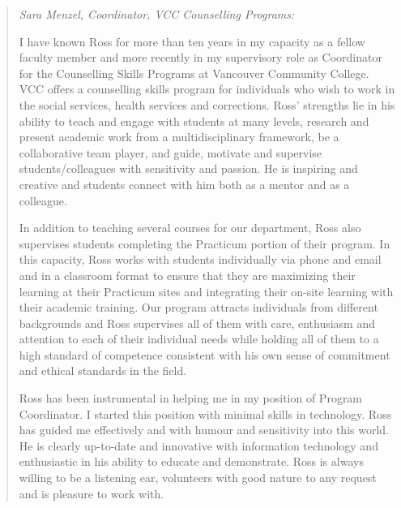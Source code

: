 \documentclass[10pt,DIV09,letterpaper,oneside,headsepline]{scrreprt}
\begin{document}
\begin{quotation}

\textit{Sara Menzel, Coordinator, VCC Counselling Programs:\\}

I have known Ross for more than ten years in my capacity as a fellow faculty member and more recently in my supervisory role as Coordinator for the Counselling Skills Programs at Vancouver Community College. VCC offers a counselling skills program for individuals who wish to work in the social services, health services and corrections. Ross' strengths lie in his ability to teach and engage with students at many levels, research and present academic work from a multidisciplinary framework, be a collaborative team player, and guide, motivate and supervise students/colleagues with sensitivity and passion. He is inspiring and creative and students connect with him both as a mentor and as a colleague.

In addition to teaching several courses for our department, Ross also supervises students completing the Practicum portion of their program. In this capacity, Ross works with students individually via phone and email and in a classroom format to ensure that they are maximizing their learning at their Practicum sites and integrating their on-site learning with their academic training. Our program attracts individuals from different backgrounds and Ross supervises all of them with care, enthusiasm and attention to each of their individual needs while holding all of them to a high standard of competence consistent with his own sense of commitment and ethical standards in the field.

Ross has been instrumental in helping me in my position of Program Coordinator. I started this position with minimal skills in technology. Ross has guided me effectively and with humour and sensitivity into this world. He is clearly up-to-date and innovative with information technology and enthusiastic in his ability to educate and demonstrate. Ross is always willing to be a listening ear, volunteers with good nature to any request and is pleasure to work with.
\end{quotation}
\newpage
\end{document}

